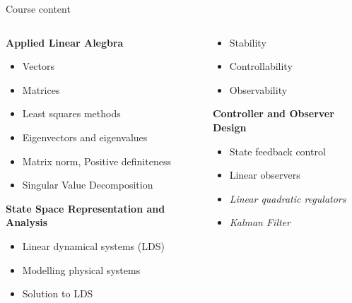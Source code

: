 \documentclass[aspectratio=169]{beamer}
\begin{document}
\begin{frame}{Course content}
\begin{columns}[T]
\begin{column}{0.5\textwidth}
\textbf{Applied Linear Alegbra}
\begin{itemize}
\item Vectors
\item Matrices
\item Least squares methods
\item Eigenvectors and eigenvalues
\item Matrix norm, Positive definiteness
\item Singular Value Decomposition
\end{itemize}
\textbf{State Space Representation and Analysis}
\begin{itemize}
\item Linear dynamical systems (LDS)
\item Modelling physical systems
\item Solution to LDS
\end{itemize}
\end{column}
\begin{column}{0.5\textwidth}  %
\begin{itemize}
\item Stability
\item Controllability
\item Observability
\end{itemize}
\textbf{Controller and Observer Design}
\begin{itemize}
\item State feedback control
\item Linear observers
\item \textit{Linear quadratic regulators}
\item \textit{Kalman Filter}
\end{itemize}
\end{column}
\end{columns}
\end{frame}
\end{document}
